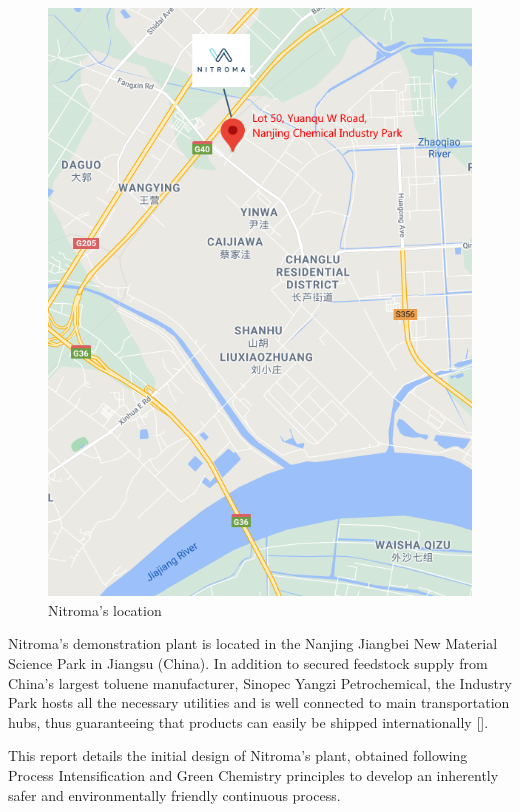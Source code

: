 \begin{figure}
    \centering
    \includegraphics[width=0.4\linewidth]{chapters/0-executive-summary/figures/Location.png}
    \caption{Nitroma's location}
    \label{fig:location}
\end{figure}
Nitroma's demonstration plant is located in the Nanjing Jiangbei New Material Science Park in Jiangsu (China). In addition to secured feedstock supply from China’s largest toluene manufacturer, Sinopec Yangzi Petrochemical, the Industry Park hosts all the necessary utilities and is well connected to main transportation hubs, thus guaranteeing that products can easily be shipped internationally []. 


This report details the initial design of Nitroma's plant, obtained following Process Intensification and Green Chemistry principles to develop an inherently safer and environmentally friendly continuous process.



